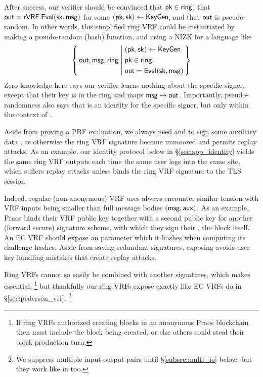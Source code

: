 After success, our verifier should be convinced that $\mathsf{pk} \in \mathsf{ring}$, that
${\mathsf{out}} = {\mathsf{rVRF}}.{\mathsf{Eval}}(\mathsf{sk},\mathsf{msg})$ for some $(\mathsf{pk},\mathsf{sk}) \leftarrow {\ensuremath{\mathsf{KeyGen}}}$,
 and that ${\mathsf{out}}$ is pseudo-random.
In other words, this simplified ring VRF could be instantiated by making
\Eval a pseudo-random (hash) function, and using a NIZK for a language like
$$ \Setst{ \Out, \msg, \ring}{
    \eprint{
        (\pk,\sk) \leftarrow \KeyGen, \quad %
        \pk \in \ring, \quad
        \Out = \Eval(\sk,\msg)
    }{
        \begin{aligned}
        & (\pk,\sk) \leftarrow \KeyGen \\
        & \pk \in \ring \\
        & \Out = \Eval(\sk,\msg)
        \end{aligned}
    }
} $$
Zero-knowledge here says our verifier learns nothing about the specific
signer, except that their key is in the ring and maps $\mathsf{msg} \mapsto {\ensuremath{\mathsf{out}}}$.
Importantly, pseudo-randomness also says that \Out is an identity
for the specific signer, but only within the context of \msg.


Aside from proving a PRF evaluation, 
we always need \rSign and \rVerify to sign some auxiliary data \aux,
as otherwise the ring VRF signature become unmoored and permits replay attacks.
%
As an example, our identity protocol below in \S\ref{sec:app_identity}
yields the same ring VRF outputs each time the same user logs into the
same site, which suffers replay attacks unless \aux binds the
ring VRF signature to the TLS session.

Indeed, regular (non-anonymous) VRF uses always encounter similar tension
with VRF inputs \msg being smaller than full message bodies $(\mathsf{msg},\mathsf{aux})$.
As an example, Praos \cite{praos} binds their VRF public key together
with a second public key for another (forward secure) signature scheme,
with which they sign their \aux, the block itself.
%
An EC VRF should expose an \aux parameter which it hashes when computing
its challenge hashes.  Aside from saving redundant signatures, exposing
\aux avoids user key handling mistakes that create replay attacks.

Ring VRFs cannot so easily be combined with another signatures, which
makes \aux essential,%
\footnote{If ring VRFs authorized creating blocks in an anonymous Praos blockchain then \aux must include the block being created, or else others could steal their block production turn.}
but thankfully our ring VRFs expose \aux exactly like EC VRFs do in \S\ref{sec:pederson_vrf}.%
\footnote{We suppress multiple input-output pairs until \S\ref{subsec:multi_io} below, but they work like in \cite{PrivacyPass} too.}

